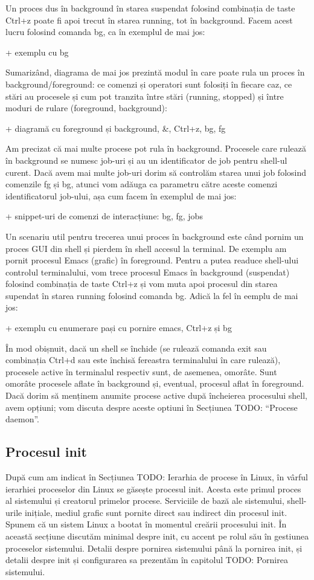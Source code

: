 Un proces dus în background în starea suspendat folosind combinația de taste
Ctrl+z poate fi apoi trecut în starea running, tot în background. Facem acest
lucru folosind comanda bg, ca în exemplul de mai jos:

+ exemplu cu bg

Sumarizând, diagrama de mai jos prezintă modul în care poate rula un proces în
background/foreground: ce comenzi și operatori sunt folosiți în fiecare caz, ce
stări au procesele și cum pot tranzita între stări (running, stopped) și între
moduri de rulare (foreground, background):

+ diagramă cu foreground și background, \&, Ctrl+z, bg, fg

Am precizat că mai multe procese pot rula în background. Procesele care rulează
în background se numesc job-uri și au un identificator de job pentru shell-ul
curent. Dacă  avem mai multe job-uri dorim să controlăm starea unui job folosind
comenzile fg și bg, atunci vom adăuga ca parametru către aceste comenzi
identificatorul job-ului, așa cum facem în exemplul de mai jos:

+ snippet-uri de comenzi de interacțiune: bg, fg, jobs

Un scenariu util pentru trecerea unui proces în background este când pornim un
proces GUI din shell și pierdem în shell accesul la terminal. De exemplu am
pornit procesul Emacs (grafic) în foreground. Pentru a putea readuce shell-ului
controlul terminalului, vom trece procesul Emacs în background (suspendat)
folosind combinația de taste Ctrl+z și vom muta apoi procesul din starea
supendat în starea running folosind comanda bg. Adică la fel în eemplu de mai
jos:

+ exemplu cu enumerare pași cu pornire emacs, Ctrl+z și bg

În mod obișnuit, dacă un shell se închide (se rulează comanda exit sau
combinația Ctrl+d sau este închisă fereastra terminalului în care rulează),
procesele active în terminalul respectiv sunt, de asemenea, omorâte. Sunt
omorâte procesele aflate în background și, eventual, procesul aflat în
foreground. Dacă dorim să menținem anumite procese active după încheierea
procesului shell, avem opțiuni; vom discuta despre aceste optiuni  în Secțiunea
TODO: “Procese daemon”.

\subsection{Procesul init}

După cum am indicat în Secțiunea TODO: Ierarhia de procese în Linux, în vârful
ierarhiei proceselor din Linux se găsește procesul init. Acesta este primul
proces al sistemului și creatorul primelor procese. Serviciile de bază ale
sistemului, shell-urile inițiale, mediul grafic sunt pornite direct sau indirect
din procesul init. Spunem că un sistem Linux a bootat în momentul creării
procesului init. În această secțiune discutăm minimal despre init, cu accent pe
rolul său în gestiunea proceselor sistemului. Detalii despre pornirea sistemului
până la pornirea init, și detalii despre init și configurarea sa prezentăm în
capitolul TODO: Pornirea sistemului.

